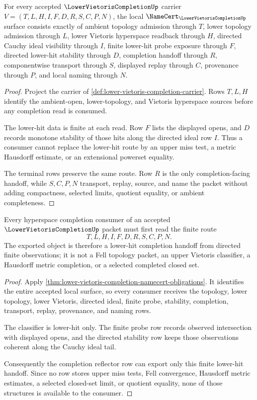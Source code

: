 \begin{theorem}
\label{thm:lower-vietoris-completion-namecert-obligations}
For every accepted $\LowerVietorisCompletionUp$ carrier $V=(T,L,H,I,F,D,R,S,C,P,N)$, the local $\NameCert_{\LowerVietorisCompletionUp}$ surface consists exactly of ambient topology admission through $T$, lower topology admission through $L$, lower Vietoris hyperspace readback through $H$, directed Cauchy ideal visibility through $I$, finite lower-hit probe exposure through $F$, directed lower-hit stability through $D$, completion handoff through $R$, componentwise transport through $S$, displayed replay through $C$, provenance through $P$, and local naming through $N$.
\end{theorem}
\begin{proof}
Project the carrier of \autoref{def:lower-vietoris-completion-carrier}. Rows $T,L,H$ identify the ambient-open, lower-topology, and Vietoris hyperspace sources before any completion read is consumed.

The lower-hit data is finite at each read. Row $F$ lists the displayed opens, and $D$ records monotone stability of those hits along the directed ideal row $I$. Thus a consumer cannot replace the lower-hit route by an upper miss test, a metric Hausdorff estimate, or an extensional powerset equality.

The terminal rows preserve the same route. Row $R$ is the only completion-facing handoff, while $S,C,P,N$ transport, replay, source, and name the packet without adding compactness, selected limits, quotient equality, or ambient completeness.
\end{proof}

\begin{theorem}
\label{thm:lower-vietoris-completion-consumer-route}
Every hyperspace completion consumer of an accepted $\LowerVietorisCompletionUp$ packet must first read the finite route
$$
T,L,H,I,F,D,R,S,C,P,N .
$$
The exported object is therefore a lower-hit completion handoff from directed finite observations; it is not a Fell topology packet, an upper Vietoris classifier, a Hausdorff metric completion, or a selected completed closed set.
\end{theorem}
\begin{proof}
Apply \autoref{thm:lower-vietoris-completion-namecert-obligations}. It identifies the entire accepted local surface, so every consumer receives the topology, lower topology, lower Vietoris, directed ideal, finite probe, stability, completion, transport, replay, provenance, and naming rows.

The classifier is lower-hit only. The finite probe row records observed intersection with displayed opens, and the directed stability row keeps those observations coherent along the Cauchy ideal tail.

Consequently the completion reflector row can export only this finite lower-hit handoff. Since no row stores upper miss tests, Fell convergence, Hausdorff metric estimates, a selected closed-set limit, or quotient equality, none of those structures is available to the consumer.
\end{proof}

